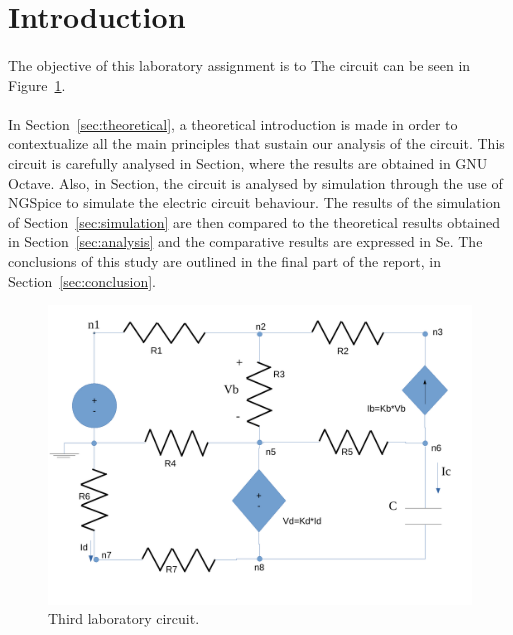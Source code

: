 \section{Introduction}
\label{sec:introduction}

\paragraph{} 
The objective of this laboratory assignment is to 
The circuit can be seen in Figure~\ref{fig:circuit}.


\paragraph{}
In Section~\ref{sec:theoretical}, a theoretical introduction is made in order to contextualize all the main principles that sustain our analysis of the circuit. This circuit is carefully analysed in Section, where the results are obtained in GNU Octave. Also, in Section, the circuit is analysed by simulation through the use of NGSpice to simulate the electric circuit behaviour. The results of the simulation of Section~\ref{sec:simulation} are then compared to the theoretical results obtained in Section~\ref{sec:analysis} and the comparative results are expressed in Se. The conclusions of this study are outlined in the final part of the report, in Section~\ref{sec:conclusion}.


\begin{figure}[h] \centering
\includegraphics[width=0.4\linewidth]{circuit.pdf}
\caption{Third laboratory circuit.}
\label{fig:circuit}
\end{figure}

